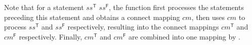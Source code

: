 Note that for a statement  $ss^\mathsf{T}$  $ss^\mathsf{F}$,
 the function \expandbranch  first processes the statements preceding this statement and obtains a connect mapping $cm$, then uses $cm$ to process $ss^\mathsf{T}$ and $ss^\mathsf{F}$ respectively, resulting into the connect mappings $cm^\mathsf{T}$ and $cm^\mathsf{F}$ respectively. Finally, $cm^\mathsf{T}$ and $cm^\mathsf{F}$ are combined into one mapping by \combinebranches.




